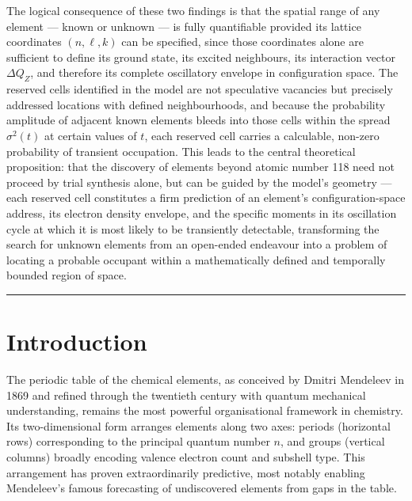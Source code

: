 \documentclass[12pt, a4paper]{article}
\newcommand{\DQ}{\Delta Q_{Z}}          %
\begin{document}
The logical consequence of these two findings is that the spatial range of any element ---
known or unknown --- is fully quantifiable provided its lattice coordinates $(n, \ell, k)$ can
be specified, since those coordinates alone are sufficient to define its ground state, its
excited neighbours, its interaction vector $\DQ$, and therefore its complete oscillatory
envelope in configuration space. The reserved cells identified in the model are not
speculative vacancies but precisely addressed locations with defined neighbourhoods, and
because the probability amplitude of adjacent known elements bleeds into those cells within
the spread $\sigma^2(t)$ at certain values of $t$, each reserved cell carries a calculable,
non-zero probability of transient occupation. This leads to the central theoretical
proposition: that the discovery of elements beyond atomic number 118 need not proceed by
trial synthesis alone, but can be guided by the model's geometry --- each reserved cell
constitutes a firm prediction of an element's configuration-space address, its electron
density envelope, and the specific moments in its oscillation cycle at which it is most likely
to be transiently detectable, transforming the search for unknown elements from an
open-ended endeavour into a problem of locating a probable occupant within a
mathematically defined and temporally bounded region of space.

{\color{ruleblue}\rule{\linewidth}{0.6pt}}

\tableofcontents
\newpage

\section{Introduction}

The periodic table of the chemical elements, as conceived by Dmitri Mendeleev in 1869 and
refined through the twentieth century with quantum mechanical understanding, remains the
most powerful organisational framework in chemistry. Its two-dimensional form arranges
elements along two axes: periods (horizontal rows) corresponding to the principal quantum
number $n$, and groups (vertical columns) broadly encoding valence electron count and
subshell type. This arrangement has proven extraordinarily predictive, most notably enabling
Mendeleev's famous forecasting of undiscovered elements from gaps in the table.
\end{document}
